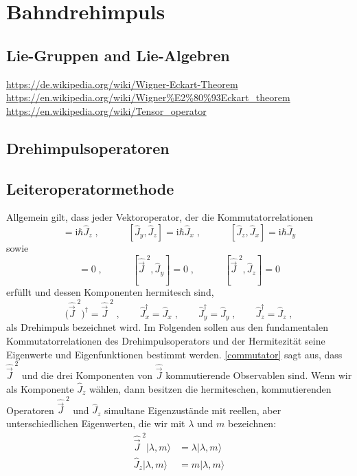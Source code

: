 \documentclass[9pt]{report}
\begin{document}
\newpage
\section{Bahndrehimpuls}
\subsection{Lie-Gruppen and Lie-Algebren}
\url{https://de.wikipedia.org/wiki/Wigner-Eckart-Theorem}\\
\url{https://en.wikipedia.org/wiki/Wigner%E2%80%93Eckart_theorem}\\
\url{https://en.wikipedia.org/wiki/Tensor_operator}
\subsection{Drehimpulsoperatoren}
\subsection{Leiteroperatormethode}
Allgemein gilt, dass jeder Vektoroperator, der die Kommutatorrelationen
\begin{equation}
[\hat{J}_x,\hat{J}_y]=\mathrm{i}\hbar\hat{J}_z\;,\qquad\quad[\hat{J}_y,\hat{J}_z]=\mathrm{i}\hbar\hat{J}_x\;,\qquad\quad[\hat{J}_z,\hat{J}_x]=\mathrm{i}\hbar\hat{J}_y
\end{equation}
sowie
\begin{equation}
[\hat{\vec{J}}^{\;2},\hat{J}_x]=0\;,\qquad\quad[\hat{\vec{J}}^{\;2},\hat{J}_y]=0\;,\qquad\quad[\hat{\vec{J}}^{\;2},\hat{J}_z]=0\label{commutator}
\end{equation}
erfüllt und dessen Komponenten hermitesch sind,
\begin{equation}
\big(\hat{\vec{J}}^{\;2}\big)^{\dagger}=\hat{\vec{J}}^{\;2}\;,\qquad\hat{J}^{\dagger}_{x}=\hat{J}_{x}\;,\qquad\hat{J}^{\dagger}_{y}=\hat{J}_{y}\;,\qquad\hat{J}^{\dagger}_{z}=\hat{J}_{z}\;,
\end{equation}
als Drehimpuls bezeichnet wird. Im Folgenden sollen aus den fundamentalen Kommutatorrelationen des Drehimpulsoperators und der Hermitezität seine Eigenwerte und Eigenfunktionen bestimmt werden. \eqref{commutator} sagt aus, dass $\hat{\vec{J}}^{\;2}$ und die drei Komponenten von $\hat{\vec{J}}$ kommutierende Observablen sind. Wenn wir als Komponente $\hat{J}_z$ wählen, dann besitzen die hermiteschen, kommutierenden Operatoren $\hat{\vec{J}}^{\;2}$ und $\hat{J}_z$ simultane Eigenzustände mit reellen, aber unterschiedlichen Eigenwerten, die wir mit $\lambda$ und $m$ bezeichnen:
\begin{align}
\hat{\vec{J}}^{\;2}|\lambda,m\rangle &= \lambda|\lambda,m\rangle\label{Eigenwert1}\\
\hat{J}_{z}|\lambda,m\rangle &= m|\lambda,m\rangle\label{Eigenwert2}
\end{align}
\end{document}
